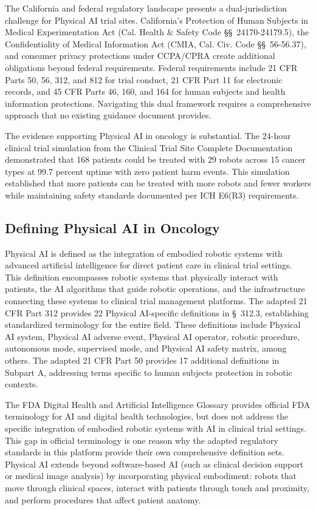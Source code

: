 The California and federal regulatory landscape presents a dual-jurisdiction
challenge for Physical AI trial sites. California's Protection of Human
Subjects in Medical Experimentation Act (Cal. Health \& Safety Code
\S\S~24170-24179.5), the Confidentiality of Medical Information Act (CMIA,
Cal. Civ. Code \S\S~56-56.37), and consumer privacy protections under
CCPA/CPRA create additional obligations beyond federal requirements. Federal
requirements include 21 CFR Parts 50, 56, 312, and 812 for trial conduct,
21 CFR Part 11 for electronic records, and 45 CFR Parts 46, 160, and 164 for
human subjects and health information protections. Navigating this dual
framework requires a comprehensive approach that no existing guidance document
provides.

The evidence supporting Physical AI in oncology is substantial. The 24-hour
clinical trial simulation from the Clinical Trial Site Complete Documentation
\cite{site-docs} demonstrated that 168 patients could be treated with 29
robots across 15 cancer types at 99.7 percent uptime with zero patient harm
events. This simulation established that more patients can be treated with
more robots and fewer workers while maintaining safety standards documented
per ICH E6(R3) requirements.

\subsection{Defining Physical AI in Oncology}
\label{subsec:defining-pai}

Physical AI is defined as the integration of embodied robotic systems with
advanced artificial intelligence for direct patient care in clinical trial
settings. This definition encompasses robotic systems that physically interact
with patients, the AI algorithms that guide robotic operations, and the
infrastructure connecting these systems to clinical trial management platforms.
The adapted 21 CFR Part 312 \cite{cfr312-adapt} provides 22 Physical AI-specific
definitions in \S~312.3, establishing standardized terminology for the entire
field. These definitions include Physical AI system, Physical AI adverse event,
Physical AI operator, robotic procedure, autonomous mode, supervised mode, and
Physical AI safety matrix, among others. The adapted 21 CFR Part 50
\cite{cfr50-adapt} provides 17 additional definitions in Subpart A, addressing
terms specific to human subjects protection in robotic contexts.

The FDA Digital Health and Artificial Intelligence Glossary
\cite{fda-ai-glossary} provides official FDA terminology for AI and digital
health technologies, but does not address the specific integration of embodied
robotic systems with AI in clinical trial settings. This gap in official
terminology is one reason why the adapted regulatory standards in this
platform provide their own comprehensive definition sets. Physical AI extends
beyond software-based AI (such as clinical decision support or medical image
analysis) by incorporating physical embodiment: robots that move through
clinical spaces, interact with patients through touch and proximity, and
perform procedures that affect patient anatomy.

